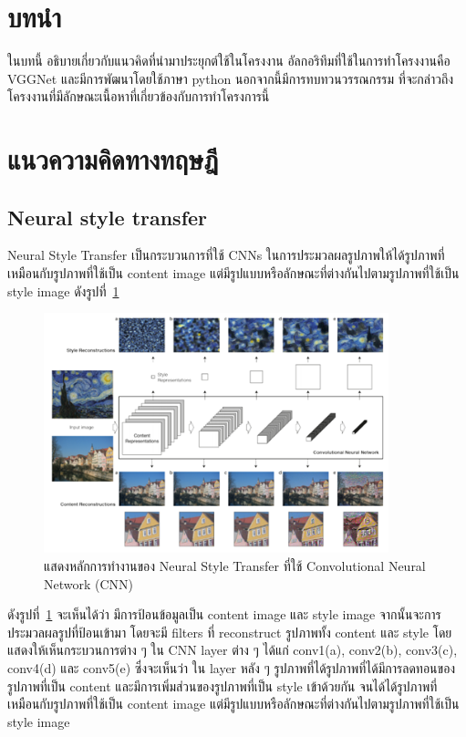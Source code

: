 \documentclass[12pt,oneside,openright,a4paper]{cpe-thai-project}
\begin{document}
\section{บทนำ}
\par\setlength{\parindent}{5ex}ในบทนี้ อธิบายเกี่ยวกับแนวคิดที่นำมาประยุกต์ใช้ในโครงงาน อัลกอริทึมที่ใช้ในการทำโครงงานคือ VGGNet และมีการพัฒนาโดยใช้ภาษา python นอกจากนี้มีการทบทวนวรรณกรรม ที่จะกล่าวถึงโครงงานที่มีลักษณะเนื้อหาที่เกี่ยวข้องกับการทำโครงการนี้

\section{แนวความคิดทางทฤษฎี}
\subsection{Neural style transfer}
\par\setlength{\parindent}{5ex}Neural Style Transfer \cite{saha2018comprehensive} เป็นกระบวนการที่ใช้ CNNs ในการประมวลผลรูปภาพให้ได้รูปภาพที่เหมือนกับรูปภาพที่ใช้เป็น content image 
แต่มีรูปแบบหรือลักษณะที่ต่างกันไปตามรูปภาพที่ใช้เป็น style image ดังรูปที่~\ref{fig:modelcnn}


\begin{figure}[!h]
  \centering
  \includegraphics[width=10cm]{./image/unit1.png}
  \caption{แสดงหลักการทำงานของ Neural Style Transfer ที่ใช้ Convolutional Neural Network (CNN) \cite{gatys2015neural} }
  \label{fig:modelcnn}
\end{figure}

\par\setlength{\parindent}{5ex}
ดังรูปที่~\ref{fig:modelcnn} จะเห็นได้ว่า มีการป้อนข้อมูลเป็น content image และ style image 
จากนั้นจะการประมวลผลรูปที่ป้อนเข้ามา โดยจะมี filters ที่ reconstruct 
รูปภาพทั้ง content และ style โดยแสดงให้เห็นกระบวนการต่าง ๆ ใน CNN layer ต่าง ๆ 
ได้แก่ conv1(a), conv2(b), conv3(c), conv4(d) และ conv5(e) 
ซึ่งจะเห็นว่า ใน layer หลัง ๆ รูปภาพที่ได้รูปภาพที่ได้มีการลดทอนของรูปภาพที่เป็น content 
และมีการเพิ่มส่วนของรูปภาพที่เป็น style เข้าด้วยกัน จนได้ได้รูปภาพที่เหมือนกับรูปภาพที่ใช้เป็น content image 
แต่มีรูปแบบหรือลักษณะที่ต่างกันไปตามรูปภาพที่ใช้เป็น style image
\end{document}
